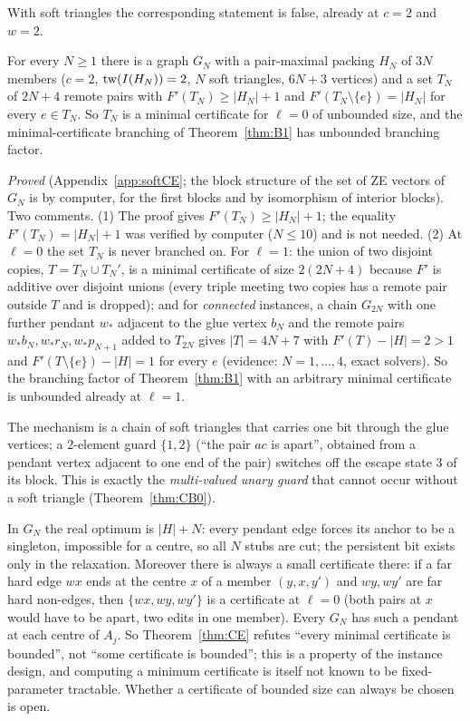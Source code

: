 With soft triangles the corresponding statement is false, already at $c=2$ and $w=2$.
\begin{theorem}\label{thm:CE}
For every $N\ge1$ there is a graph $G_N$ with a pair-maximal packing $H_N$ of $3N$ members ($c=2$, $\mathrm{tw}(I(H_N))=2$, $N$ soft triangles, $6N+3$ vertices) and a set $T_N$ of $2N+4$ remote pairs with $F'(T_N)\ge|H_N|+1$ and $F'(T_N\setminus\{e\})=|H_N|$ for every $e\in T_N$. So $T_N$ is a minimal certificate for $\ell=0$ of unbounded size, and the minimal-certificate branching of Theorem~\ref{thm:B1} has unbounded branching factor.
\end{theorem}
\emph{Proved} (Appendix~\ref{app:softCE}; the block structure of the set of ZE vectors of $G_N$ is by computer, for the first blocks and by isomorphism of interior blocks). Two comments. (1) The proof gives $F'(T_N)\ge|H_N|+1$; the equality $F'(T_N)=|H_N|+1$ was verified by computer ($N\le10$) and is not needed. (2) At $\ell=0$ the set $T_N$ is never branched on. For $\ell=1$: the union of two disjoint copies, $T=T_N\cup T_N'$, is a minimal certificate of size $2(2N+4)$ because $F'$ is additive over disjoint unions (every triple meeting two copies has a remote pair outside $T$ and is dropped); and for \emph{connected} instances, a chain $G_{2N}$ with one further pendant $w_*$ adjacent to the glue vertex $b_N$ and the remote pairs $w_*b_N,w_*r_N,w_*p_{N+1}$ added to $T_{2N}$ gives $|T|=4N+7$ with $F'(T)-|H|=2>1$ and $F'(T\setminus\{e\})-|H|=1$ for every $e$ (evidence: $N=1,\dots,4$, exact solvers). So the branching factor of Theorem~\ref{thm:B1} with an arbitrary minimal certificate is unbounded already at $\ell=1$.

The mechanism is a chain of soft triangles that carries one bit through the glue vertices; a $2$-element guard $\{1,2\}$ (``the pair $ac$ is apart'', obtained from a pendant vertex adjacent to one end of the pair) switches off the escape state $3$ of its block. This is exactly the \emph{multi-valued unary guard} that cannot occur without a soft triangle (Theorem~\ref{thm:CB0}).
\begin{remark}\label{rem:mincert}
In $G_N$ the real optimum is $|H|+N$: every pendant edge forces its anchor to be a singleton, impossible for a centre, so all $N$ stubs are cut; the persistent bit exists only in the relaxation. Moreover there is always a small certificate there: if a far hard edge $wx$ ends at the centre $x$ of a member $(y,x,y')$ and $wy,wy'$ are far hard non-edges, then $\{wx,wy,wy'\}$ is a certificate at $\ell=0$ (both pairs at $x$ would have to be apart, two edits in one member). Every $G_N$ has such a pendant at each centre of $A_j$. So Theorem~\ref{thm:CE} refutes ``every minimal certificate is bounded'', not ``some certificate is bounded''; this is a property of the instance design, and computing a minimum certificate is itself not known to be fixed-parameter tractable. Whether a certificate of bounded size can always be chosen is open.
\end{remark}

